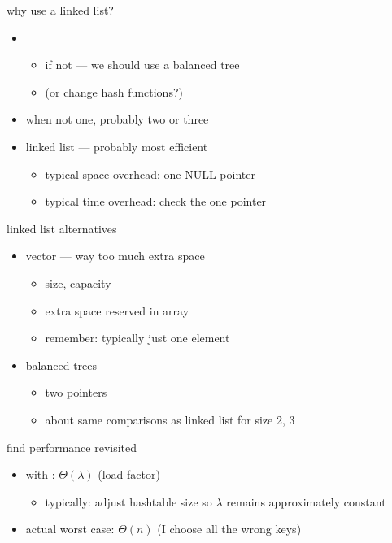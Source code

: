 \begin{frame}{why use a linked list?}
\begin{itemize}
\item {}
\begin{itemize}
    \item if not --- we should use a balanced tree
    \item (or change hash functions?)
\end{itemize}
\item when not one, probably two or three
\item linked list --- probably most efficient
\begin{itemize}
    \item typical space overhead: one NULL pointer
    \item typical time overhead: check the one pointer
\end{itemize}
\end{itemize}
\end{frame}

\begin{frame}{linked list alternatives}
\begin{itemize}
\item vector --- way too much extra space
    \begin{itemize}
    \item size, capacity
    \item extra space reserved in array
    \item remember: typically just one element
    \end{itemize}
\item balanced trees
    \begin{itemize}
    \item two pointers
    \item about same comparisons as linked list for size 2, 3
    \end{itemize}
\end{itemize}
\end{frame}

\begin{frame}{find performance revisited}
\begin{itemize}
\item with : $\Theta(\lambda)$ (load factor)
    \begin{itemize}
    \item typically: adjust hashtable size so $\lambda$ remains approximately constant
    \end{itemize}
\item actual worst case: $\Theta(n)$ (I choose all the wrong keys)
\end{itemize}
\end{frame}

